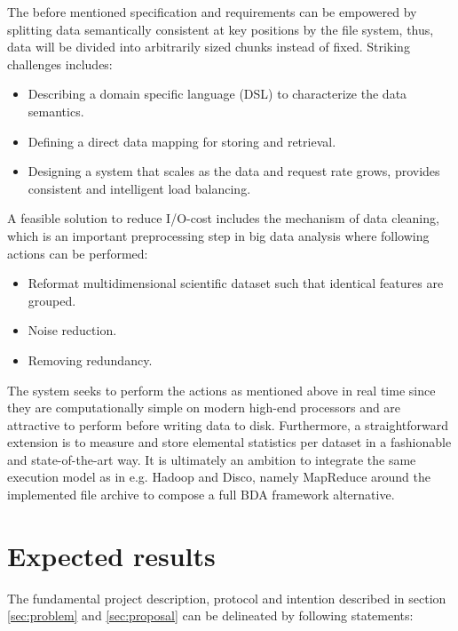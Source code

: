 The before mentioned specification and requirements can be empowered by splitting data semantically consistent at key positions by the file system, thus, data will be divided into arbitrarily sized chunks instead of fixed. Striking challenges includes:
\vspace*{5mm}
\begin{itemize}
	\item Describing a domain specific language (DSL) to characterize the data semantics.
	\item Defining a direct data mapping for storing and retrieval.
	\item Designing a system that scales as the data and request rate grows, \ie provides consistent and intelligent load balancing.
\end{itemize}
\vspace*{5mm}

A feasible solution to reduce I/O-cost includes the mechanism of data cleaning, which is an important preprocessing step in big data analysis where \ie following actions can be performed:
\vspace*{5mm}
\begin{itemize}
	\item Reformat multidimensional scientific dataset such that identical features are grouped.
	\item Noise reduction.
	\item Removing redundancy.
\end{itemize}
\vspace*{5mm}

The system seeks to perform the actions as mentioned above in real time since they are computationally simple on modern high-end processors and are attractive to perform before writing data to disk. Furthermore, a straightforward extension is to measure and store elemental statistics per dataset in a fashionable and state-of-the-art way. It is ultimately an ambition to integrate the same execution model as in e.g. Hadoop and Disco, namely MapReduce around the implemented file archive to compose a full BDA framework alternative.

\section{Expected results}
The fundamental project description, protocol and intention described in \eg section \ref{sec:problem} and \ref{sec:proposal} can be delineated by following statements:


